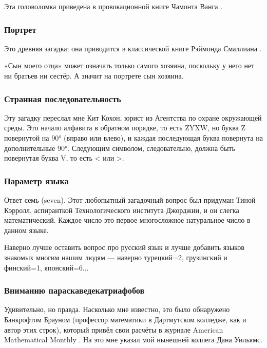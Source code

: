 Эта головоломка приведена в провокационной книге Чамонта Ванга \cite{wang}.

\subsubsection*{Портрет}

Это древняя загадка;
она приводится в классической книге Рэймонда Смаллиана \cite{smullyan}.

«Сын моего отца» может означать только самого хозяина, поскольку у него нет ни братьев ни сестёр.
А значит на портрете сын хозяина.

\subsubsection*{Странная последовательность}

Эту загадку переслал мне Кит Кохон, юрист из Агентства по охране окружающей среды.
Это начало алфавита в обратном порядке, то есть ZYXW, но буква Z повернутой на 90° (вправо или влево), и каждая последующая буква повернута на дополнительные 90°.
Следующим символом, следовательно, должна быть повернутая буква V, то есть < или >.

\subsubsection*{Параметр языка}

Ответ семь (seven).
Этот любопытный загадочный вопрос был придуман Тиной Кэрролл, аспиранткой Технологического института Джорджии,
и он слегка математический. 
Каждое число это первое многосложное натуральное число в данном языке.

\begin{addedbytheeditors}
Наверно лучше оставить вопрос про русский язык и лучше добавить языков знакомых многим нашим людям --- наверно турецкий=2, грузинский и финский=1, японский=6...
\end{addedbytheeditors}


\subsubsection*{Вниманию параскаведекатриафобов}

Удивительно, но правда.
Насколько мне известно, это было обнаружено Банкрофтом Брауном (профессор математики в Дартмутском колледже, как и автор этих строк), который привёл свои расчёты в журнале American Mathematical Monthly \cite{brown}.
На это мне указал мой нынешней коллега Дана Уильямс.

